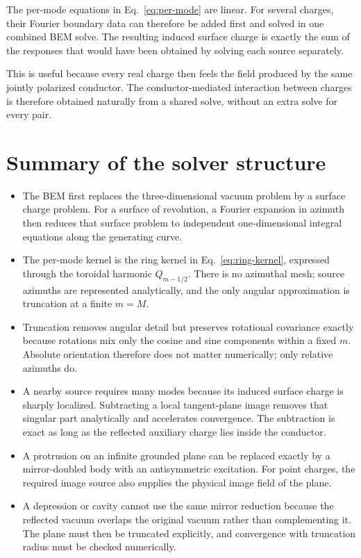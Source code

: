 \documentclass[11pt]{article}
\begin{document}
The per-mode equations in Eq.~\eqref{eq:per-mode} are linear.  For several
charges, their Fourier boundary data can therefore be added first and solved in
one combined BEM solve.  The resulting induced surface charge is exactly the
sum of the responses that would have been obtained by solving each source
separately.

This is useful because every real charge then feels the field produced by the
same jointly polarized conductor.  The conductor-mediated interaction between
charges is therefore obtained naturally from a shared solve, without an extra
solve for every pair.

\section{Summary of the solver structure}

\begin{itemize}
\item The BEM first replaces the three-dimensional vacuum problem by a surface
  charge problem.  For a surface of revolution, a Fourier expansion in azimuth
  then reduces that surface problem to independent one-dimensional integral
  equations along the generating curve.

\item The per-mode kernel is the ring kernel in Eq.~\eqref{eq:ring-kernel},
  expressed through the toroidal harmonic $Q_{m-1/2}$.  There is no azimuthal
  mesh; source azimuths are represented analytically, and the only angular
  approximation is truncation at a finite $m=M$.

\item Truncation removes angular detail but preserves rotational covariance
  exactly because rotations mix only the cosine and sine components within a
  fixed $m$.  Absolute orientation therefore does not matter numerically; only
  relative azimuths do.

\item A nearby source requires many modes because its induced surface charge is
  sharply localized.  Subtracting a local tangent-plane image removes that
  singular part analytically and accelerates convergence.  The subtraction is
  exact as long as the reflected auxiliary charge lies inside the conductor.

\item A protrusion on an infinite grounded plane can be replaced exactly by a
  mirror-doubled body with an antisymmetric excitation.  For point charges, the
  required image source also supplies the physical image field of the plane.

\item A depression or cavity cannot use the same mirror reduction because the
  reflected vacuum overlaps the original vacuum rather than complementing it.
  The plane must then be truncated explicitly, and convergence with truncation
  radius must be checked numerically.
\end{itemize}
\end{document}

